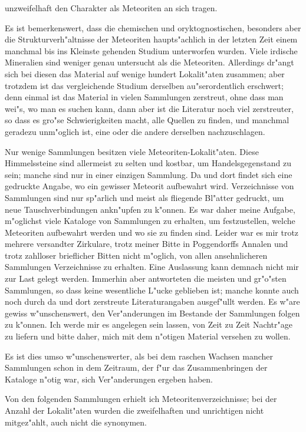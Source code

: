 \documentclass[a4paper, 11pt, oneside]{article}
\begin{document}
unzweifelhaft den Charakter als Meteoriten an sich tragen.

Es ist bemerkenswert, dass die chemischen und oryktognostischen, besonders aber die Strukturverh"altnisse der Meteoriten haupts"achlich in der letzten Zeit einem manchmal bis ins Kleinste gehenden Studium unterworfen wurden. Viele irdische Mineralien sind weniger genau untersucht als die Meteoriten. Allerdings dr"angt sich bei diesen das Material auf wenige hundert Lokalit"aten zusammen; aber trotzdem ist das vergleichende Studium derselben au"serordentlich erschwert; denn einmal ist das Material in vielen Sammlungen zerstreut, ohne dass man wei"s, wo man es suchen kann, dann aber ist die Literatur noch viel zerstreuter, so dass es gro"se Schwierigkeiten macht, alle Quellen zu finden, und manchmal geradezu unm"oglich ist, eine oder die andere derselben nachzuschlagen.

Nur wenige Sammlungen besitzen viele Meteoriten-Lokalit"aten. Diese Himmelssteine sind allermeist zu selten und kostbar, um Handelsgegenstand zu sein; manche sind nur in einer einzigen Sammlung. Da und dort findet sich eine gedruckte Angabe, wo ein gewisser Meteorit aufbewahrt wird. Verzeichnisse von Sammlungen sind nur sp"arlich und meist als fliegende Bl"atter gedruckt, um neue Tauschverbindungen ankn"upfen zu k"onnen. Es war daher meine Aufgabe, m"oglichst viele Kataloge von Sammlungen zu erhalten, um festzustellen, welche Meteoriten aufbewahrt werden und wo sie zu finden sind. Leider war es mir trotz mehrere versandter Zirkulare, trotz meiner Bitte in Poggendorffs Annalen und trotz zahlloser brieflicher Bitten nicht m"oglich, von allen ansehnlicheren Sammlungen Verzeichnisse zu erhalten. Eine Auslassung kann demnach nicht mir zur Last gelegt werden. Immerhin aber antworteten die meisten und gr"o"sten Sammlungen, so dass keine wesentliche L"ucke geblieben ist; manche konnte auch noch durch da und dort zerstreute Literaturangaben ausgef"ullt werden. Es w"are gewiss w"unschenswert, den Ver"anderungen im Bestande der Sammlungen folgen zu k"onnen. Ich werde mir es angelegen sein lassen, von Zeit zu Zeit Nachtr"age zu liefern und bitte daher, mich mit dem n"otigen Material versehen zu wollen.

Es ist dies umso w"unschenswerter, als bei dem raschen Wachsen mancher Sammlungen schon in dem Zeitraum, der f"ur das Zusammenbringen der Kataloge n"otig war, sich Ver"anderungen ergeben haben.

Von den folgenden Sammlungen erhielt ich Meteoritenverzeichnisse; bei der Anzahl der Lokalit"aten wurden die zweifelhaften und unrichtigen nicht mitgez"ahlt, auch nicht die synonymen.
\clearpage
\end{document}
